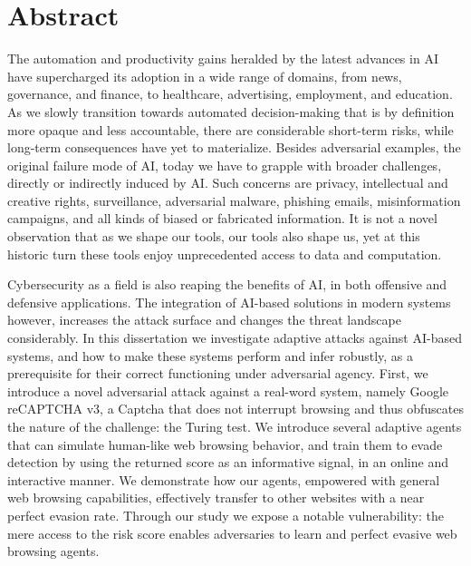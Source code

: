 \chapter{Abstract}
\label{ch:abstract}

The automation and productivity gains heralded by the latest advances in \gls{AI} have supercharged its adoption in a wide range of domains, from news, governance, and finance, to healthcare, advertising, employment, and education.
As we slowly transition towards automated decision-making that is by definition more opaque and less accountable, there are considerable short-term risks, while long-term consequences have yet to materialize.
Besides adversarial examples, the original failure mode of \gls{AI}, today we have to grapple with broader challenges, directly or indirectly induced by \gls{AI}.
Such concerns are privacy, intellectual and creative rights, surveillance, adversarial malware, phishing emails, misinformation campaigns, and all kinds of biased or fabricated information.
It is not a novel observation that as we shape our tools, our tools also shape us, yet at this historic turn these tools enjoy unprecedented access to data and computation.

Cybersecurity as a field is also reaping the benefits of \gls{AI}, in both offensive and defensive applications.
The integration of AI-based solutions in modern systems however, increases the attack surface and changes the threat landscape considerably.
In this dissertation we investigate adaptive attacks against AI-based systems, and how to make these systems perform and infer robustly, as a prerequisite for their correct functioning under adversarial agency.
First, we introduce a novel adversarial attack against a real-word system, namely Google reCAPTCHA v3, a Captcha that does not interrupt browsing and thus obfuscates the nature of the challenge: the Turing test.
We introduce several adaptive agents that can simulate human-like web browsing behavior, and train them to evade detection by using the returned score as an informative signal, in an online and interactive manner.
We demonstrate how our agents, empowered with general web browsing capabilities, effectively transfer to other websites with a near perfect evasion rate.
Through our study we expose a notable vulnerability: the mere access to the risk score enables adversaries to learn and perfect evasive web browsing agents.

